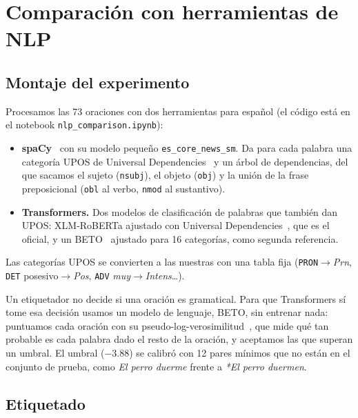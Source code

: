 \section{Comparación con herramientas de NLP}
\label{sec:comparacion_nlp}

\subsection{Montaje del experimento}

Procesamos las 73 oraciones con dos herramientas para español (el código está en el notebook
\texttt{nlp\_comparison.ipynb}):
\begin{itemize}
  \item \textbf{spaCy}~\cite{spacy} con su modelo pequeño \texttt{es\_core\_news\_sm}. Da para
    cada palabra una categoría UPOS de Universal Dependencies~\cite{ud} y un árbol de
    dependencias, del que sacamos el sujeto (\texttt{nsubj}), el objeto (\texttt{obj}) y la
    unión de la frase preposicional (\texttt{obl} al verbo, \texttt{nmod} al sustantivo).
  \item \textbf{Transformers.} Dos modelos de clasificación de palabras que también dan UPOS:
    XLM-RoBERTa ajustado con Universal Dependencies~\cite{xlmr, devries}, que es el oficial, y
    un BETO~\cite{beto} ajustado para 16 categorías, como segunda referencia.
\end{itemize}
Las categorías UPOS se convierten a las nuestras con una tabla fija (\texttt{PRON}$\to$\textit{Prn},
\texttt{DET} posesivo$\to$\textit{Pos}, \texttt{ADV} \emph{muy}$\to$\textit{Intens}…).

Un etiquetador no decide si una oración es gramatical. Para que Transformers sí tome esa decisión
usamos un modelo de lenguaje, BETO, sin entrenar nada: puntuamos cada oración con su
pseudo-log-verosimilitud~\cite{salazar, kauf}, que mide qué tan probable es cada palabra dado el
resto de la oración, y aceptamos las que superan un umbral. El umbral (\(-3.88\)) se calibró con
12 pares mínimos que no están en el conjunto de prueba, como \emph{El perro duerme} frente a
\emph{*El perro duermen}.

\subsection{Etiquetado}

